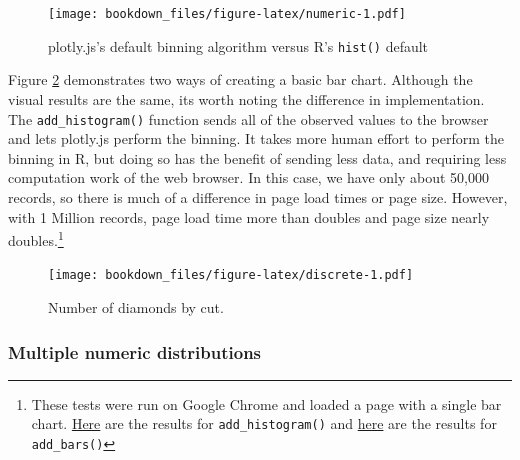 \documentclass[12pt,]{isuthesis}
\newenvironment{Shaded}{\begin{snugshade}}{\end{snugshade}}
\newcommand{\KeywordTok}[1]{\textcolor[rgb]{0.13,0.29,0.53}{\textbf{{#1}}}}
\newcommand{\DataTypeTok}[1]{\textcolor[rgb]{0.13,0.29,0.53}{{#1}}}
\newcommand{\StringTok}[1]{\textcolor[rgb]{0.31,0.60,0.02}{{#1}}}
\newcommand{\NormalTok}[1]{{#1}}
\let\rmarkdownfootnote\footnote%
\def\footnote{\protect\rmarkdownfootnote}
\begin{document}
\begin{figure}[htbp]
\centering
\texttt{[image: bookdown\_files/figure-latex/numeric-1.pdf]}
\caption{\label{fig:numeric}plotly.js's default binning algorithm versus R's
\texttt{hist()} default}
\end{figure}

Figure \ref{fig:discrete} demonstrates two ways of creating a basic bar
chart. Although the visual results are the same, its worth noting the
difference in implementation. The \texttt{add\_histogram()} function
sends all of the observed values to the browser and lets plotly.js
perform the binning. It takes more human effort to perform the binning
in R, but doing so has the benefit of sending less data, and requiring
less computation work of the web browser. In this case, we have only
about 50,000 records, so there is much of a difference in page load
times or page size. However, with 1 Million records, page load time more
than doubles and page size nearly doubles.\footnote{These tests were run
  on Google Chrome and loaded a page with a single bar chart.
  \href{https://www.webpagetest.org/result/160924_DP_JBX/}{Here} are the
  results for \texttt{add\_histogram()} and
  \href{https://www.webpagetest.org/result/160924_QG_JA1/}{here} are the
  results for \texttt{add\_bars()}}

\begin{Shaded}
\end{Shaded}

\begin{figure}[htbp]
\centering
\texttt{[image: bookdown\_files/figure-latex/discrete-1.pdf]}
\caption{\label{fig:discrete}Number of diamonds by cut.}
\end{figure}

\subsubsection{Multiple numeric
distributions}\label{multiple-numeric-distributions}
\end{document}
